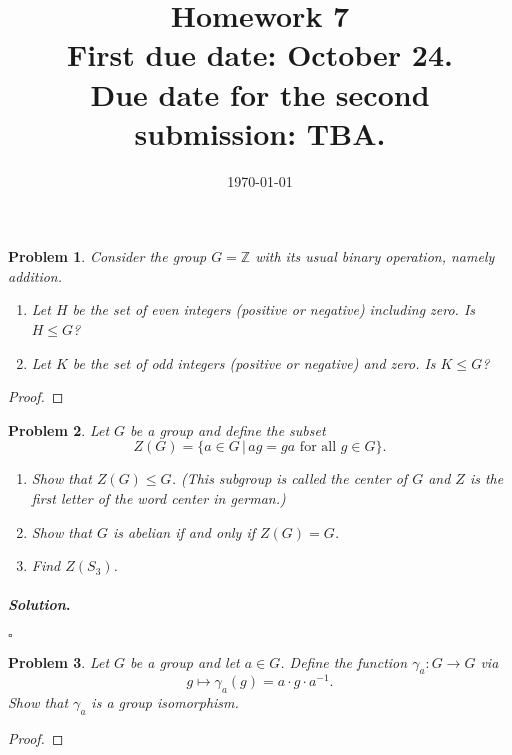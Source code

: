 \documentclass[reqno]{amsart}
\theoremstyle{plain}
\newtheorem{problem}{Problem}
\theoremstyle{definition}
\newenvironment{solution}{\paragraph{\emph{Solution}.}}{\hfill$\square$}
\begin{document}
 

\title[Homework 7]{Homework 7 \\ First due date: October 24.  \\  Due date for the second submission: TBA.}

\date{\today} 
\maketitle 


\begin{problem}
Consider the group $G  = \mathbb{Z}$ with its usual binary operation, namely addition. 
\begin{enumerate}
\item Let $H$ be the set of even integers (positive or negative) including zero.  Is $H \le G$?
\item Let $K$ be the set of odd integers (positive or negative) and zero.  Is $K \le G$?
\end{enumerate}
\end{problem}
\begin{proof}

\end{proof}


\begin{problem}
Let $G$ be a group and define the subset
$$Z(G)  =\{ a \in G \, | \, ag = ga \text{ for all } g \in G\}. $$
\begin{enumerate}
\item Show that $Z(G) \le G$. (This subgroup is called the \emph{center} of $G$ and $Z$ is the first letter of the word center in german.)
\item Show that $G$ is abelian if and only if $Z(G) = G$.
\item Find $Z(S_{3})$.
\end{enumerate}
\end{problem}
\begin{solution}

\end{solution}

\begin{problem}
Let $G$ be a group and let $a \in G$.  Define the function $\gamma_{a}:G \longrightarrow G$ via
$$g \mapsto \gamma_{a}(g) = a \cdot g \cdot a^{-1}. $$
Show that $\gamma_{a}$ is a group isomorphism.
\end{problem}
\begin{proof}

\end{proof}
\end{document}
